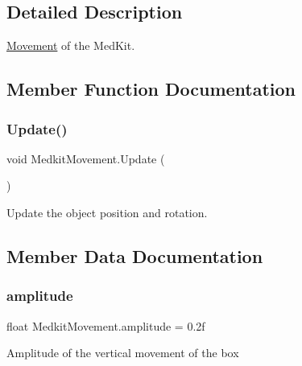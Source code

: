 \subsection{Detailed Description}
\mbox{\hyperlink{class_movement}{Movement}} of the Med\+Kit. 

\subsection{Member Function Documentation}
\mbox{\label{class_medkit_movement_aee87ec8c63ab7518c7c4330a33278257}} 
\subsubsection{\texorpdfstring{Update()}{Update()}}
{\footnotesize\ttfamily void Medkit\+Movement.\+Update (\begin{DoxyParamCaption}{ }\end{DoxyParamCaption})\hspace{0.3cm}{\ttfamily [private]}}



Update the object position and rotation. 



\subsection{Member Data Documentation}
\mbox{\label{class_medkit_movement_ab7b1fda4dcf8bb05a678c2031f55089b}} 
\subsubsection{\texorpdfstring{amplitude}{amplitude}}
{\footnotesize\ttfamily float Medkit\+Movement.\+amplitude = 0.\+2f\hspace{0.3cm}{\ttfamily [private]}}

Amplitude of the vertical movement of the box \mbox{\label{class_medkit_movement_a3bd1b0eac19a16fcd154e4526e3f242a}} 
